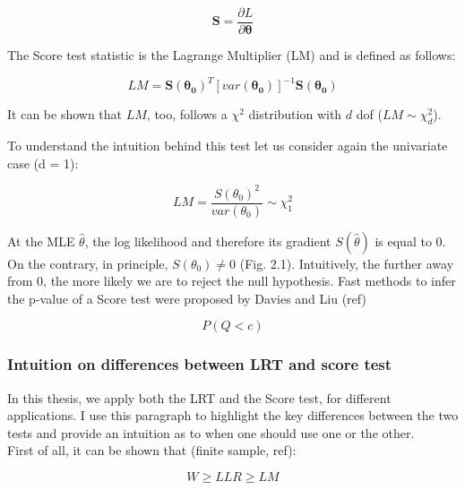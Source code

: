 \begin{equation}
    \mathbf{S} = \frac{\partial L}{\partial \boldsymbol{\theta}}
\end{equation}

The Score test statistic is the Lagrange Multiplier (LM) and is defined as follows:

\begin{equation}
    LM = \mathbf{S}(\boldsymbol{\theta_0})^T [var(\boldsymbol{\theta_0})]^{-1}\mathbf{S}(\boldsymbol{\theta_0}) 
\end{equation}

It can be shown that $LM$, too, follows a $\chi^2$ distribution with $d$ dof ($LM \sim \chi^2_d$).

To understand the intuition behind this test let us consider again the univariate case (d = 1):

\begin{equation}
    LM = \frac{S(\theta_0)^2}{var(\theta_0)} \sim \chi^2_1
\end{equation}

At the MLE $\hat{\theta}$, the log likelihood and therefore its gradient $S(\hat{\theta})$ is equal to 0.
On the contrary, in principle, $ S(\theta_0) \neq 0 $ (Fig. 2.1). 
Intuitively, the further away from 0, the more likely we are to reject the null hypothesis.
Fast methods to infer the p-value of a Score test were proposed by Davies  \cite{davies1980algorithm} and Liu (ref)


\begin{equation}
    P(Q<c)
\end{equation}


\subsubsection{Intuition on differences between LRT and score test}

In this thesis, we apply both the LRT and the Score test, for different applications.
I use this paragraph to highlight the key differences between the two tests and provide an intuition as to when one should use one or the other.\\

First of all, it can be shown that (finite sample, ref):

\begin{equation}
    W \geq LLR \geq LM
\end{equation}


